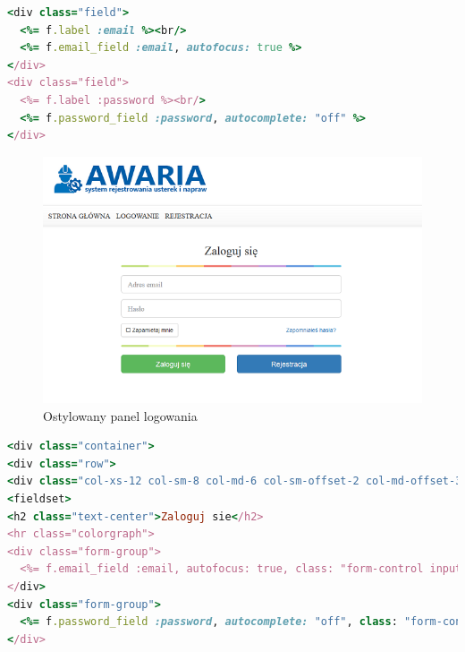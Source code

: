 \documentclass[openright]{xmgr}
\begin{document}
	\newpage
	\begin{lstlisting}[language=Ruby,lineskip={-1pt},caption=Kod odpowiedzialny za panel logowania]
<div class="field">
  <%= f.label :email %><br/>
  <%= f.email_field :email, autofocus: true %>
</div>
<div class="field">
  <%= f.label :password %><br/>
  <%= f.password_field :password, autocomplete: "off" %>
</div>
	\end{lstlisting}
	
	\begin{figure}[!tbh]
		\centering
		\includegraphics[width=\linewidth]{image/panelhtml}
		\caption{Ostylowany panel logowania}
	\end{figure}
\newpage
	\begin{lstlisting}[language=Ruby,lineskip={-1pt},caption= Kod obudowany kodem HTML]
<div class="container">
<div class="row">
<div class="col-xs-12 col-sm-8 col-md-6 col-sm-offset-2 col-md-offset-3">
<fieldset>
<h2 class="text-center">Zaloguj sie</h2>
<hr class="colorgraph">
<div class="form-group">
  <%= f.email_field :email, autofocus: true, class: "form-control input-lg", placeholder: "Adres email" %>
</div>
<div class="form-group">
  <%= f.password_field :password, autocomplete: "off", class: "form-control input-lg", placeholder: "Haslo"  %>
</div>
	\end{lstlisting}
\end{document}
